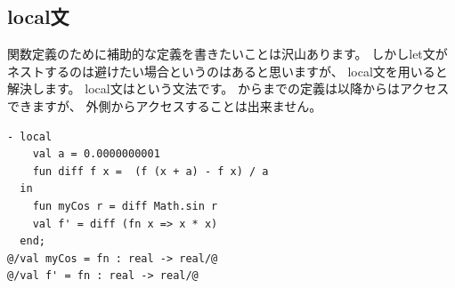 \documentclass[11pt,a4paper]{article}
\begin{document}
\subsection{local文}

関数定義のために補助的な定義を書きたいことは沢山あります。
しかしlet文がネストするのは避けたい場合というのはあると思いますが、
local文を用いると解決します。
local文はという文法です。
からまでの定義は以降からはアクセスできますが、
外側からアクセスすることは出来ません。

\begin{lstlisting}[caption=local文]
- local
    val a = 0.0000000001
    fun diff f x =  (f (x + a) - f x) / a
  in
    fun myCos r = diff Math.sin r
    val f' = diff (fn x => x * x)
  end;
@/val myCos = fn : real -> real/@
@/val f' = fn : real -> real/@
\end{lstlisting}





\end{document}
